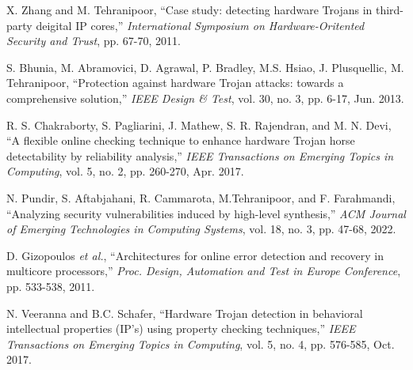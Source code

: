 \documentclass[10pt,journal, compsoc]{IEEEtran}
\begin{document}
\begin{thebibliography}{99}


X. Zhang and M. Tehranipoor, ``Case study: detecting hardware Trojans in third-party deigital IP cores,'' \textit{International Symposium on Hardware-Oritented Security and Trust}, pp. 67-70, 2011.






S. Bhunia, M. Abramovici, D. Agrawal, P. Bradley, M.S. Hsiao, J. Plusquellic, M. Tehranipoor, ``Protection against hardware Trojan attacks: towards a comprehensive solution,'' \textit{IEEE Design \& Test}, vol. 30, no. 3,  pp. 6-17, Jun. 2013.


R. S. Chakraborty, S. Pagliarini, J. Mathew, S. R. Rajendran, and M. N. Devi, ``A flexible online checking technique to enhance hardware Trojan horse detectability by reliability analysis,'' \textit{IEEE Transactions on Emerging Topics in Computing}, vol. 5, no. 2, pp. 260-270, Apr. 2017.




N. Pundir, S. Aftabjahani, R. Cammarota, M.Tehranipoor, and F. Farahmandi,  ``Analyzing security vulnerabilities induced by high-level synthesis,'' \textit{ACM Journal of Emerging Technologies in Computing Systems}, vol. 18, no. 3, pp. 47-68, 2022.







D. Gizopoulos \textit{et al.}, ``Architectures for online error detection and recovery in multicore processors,'' \textit{Proc. Design, Automation and Test in Europe Conference}, pp. 533-538, 2011.

N. Veeranna and B.C. Schafer, ``Hardware Trojan detection in behavioral intellectual properties (IP's) using property checking techniques,'' \textit{IEEE Transactions on Emerging Topics in Computing}, vol. 5, no. 4, pp. 576-585, Oct. 2017.








\end{thebibliography}
\end{document}
